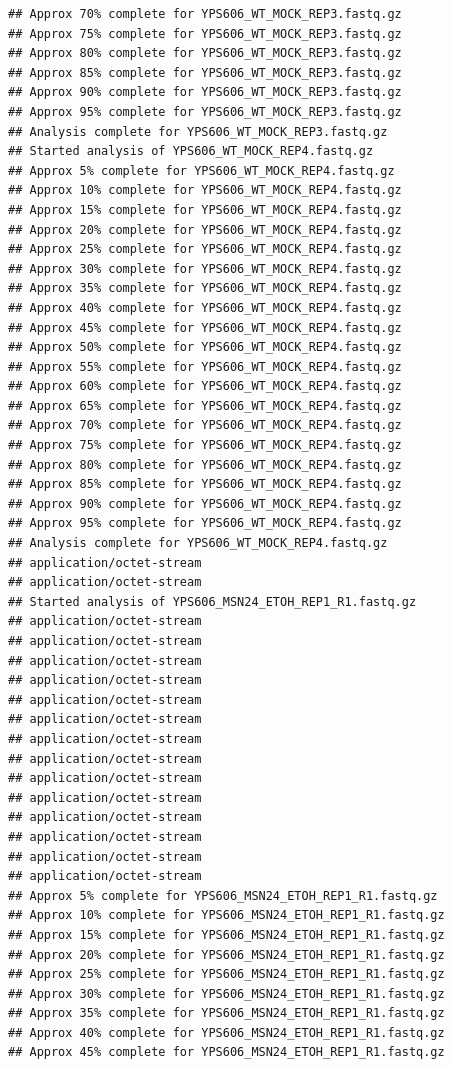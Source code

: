 \documentclass[
]{book}
\begin{document}
\begin{verbatim}
## Approx 70% complete for YPS606_WT_MOCK_REP3.fastq.gz
## Approx 75% complete for YPS606_WT_MOCK_REP3.fastq.gz
## Approx 80% complete for YPS606_WT_MOCK_REP3.fastq.gz
## Approx 85% complete for YPS606_WT_MOCK_REP3.fastq.gz
## Approx 90% complete for YPS606_WT_MOCK_REP3.fastq.gz
## Approx 95% complete for YPS606_WT_MOCK_REP3.fastq.gz
## Analysis complete for YPS606_WT_MOCK_REP3.fastq.gz
## Started analysis of YPS606_WT_MOCK_REP4.fastq.gz
## Approx 5% complete for YPS606_WT_MOCK_REP4.fastq.gz
## Approx 10% complete for YPS606_WT_MOCK_REP4.fastq.gz
## Approx 15% complete for YPS606_WT_MOCK_REP4.fastq.gz
## Approx 20% complete for YPS606_WT_MOCK_REP4.fastq.gz
## Approx 25% complete for YPS606_WT_MOCK_REP4.fastq.gz
## Approx 30% complete for YPS606_WT_MOCK_REP4.fastq.gz
## Approx 35% complete for YPS606_WT_MOCK_REP4.fastq.gz
## Approx 40% complete for YPS606_WT_MOCK_REP4.fastq.gz
## Approx 45% complete for YPS606_WT_MOCK_REP4.fastq.gz
## Approx 50% complete for YPS606_WT_MOCK_REP4.fastq.gz
## Approx 55% complete for YPS606_WT_MOCK_REP4.fastq.gz
## Approx 60% complete for YPS606_WT_MOCK_REP4.fastq.gz
## Approx 65% complete for YPS606_WT_MOCK_REP4.fastq.gz
## Approx 70% complete for YPS606_WT_MOCK_REP4.fastq.gz
## Approx 75% complete for YPS606_WT_MOCK_REP4.fastq.gz
## Approx 80% complete for YPS606_WT_MOCK_REP4.fastq.gz
## Approx 85% complete for YPS606_WT_MOCK_REP4.fastq.gz
## Approx 90% complete for YPS606_WT_MOCK_REP4.fastq.gz
## Approx 95% complete for YPS606_WT_MOCK_REP4.fastq.gz
## Analysis complete for YPS606_WT_MOCK_REP4.fastq.gz
## application/octet-stream
## application/octet-stream
## Started analysis of YPS606_MSN24_ETOH_REP1_R1.fastq.gz
## application/octet-stream
## application/octet-stream
## application/octet-stream
## application/octet-stream
## application/octet-stream
## application/octet-stream
## application/octet-stream
## application/octet-stream
## application/octet-stream
## application/octet-stream
## application/octet-stream
## application/octet-stream
## application/octet-stream
## application/octet-stream
## Approx 5% complete for YPS606_MSN24_ETOH_REP1_R1.fastq.gz
## Approx 10% complete for YPS606_MSN24_ETOH_REP1_R1.fastq.gz
## Approx 15% complete for YPS606_MSN24_ETOH_REP1_R1.fastq.gz
## Approx 20% complete for YPS606_MSN24_ETOH_REP1_R1.fastq.gz
## Approx 25% complete for YPS606_MSN24_ETOH_REP1_R1.fastq.gz
## Approx 30% complete for YPS606_MSN24_ETOH_REP1_R1.fastq.gz
## Approx 35% complete for YPS606_MSN24_ETOH_REP1_R1.fastq.gz
## Approx 40% complete for YPS606_MSN24_ETOH_REP1_R1.fastq.gz
## Approx 45% complete for YPS606_MSN24_ETOH_REP1_R1.fastq.gz

\end{verbatim}
\end{document}

